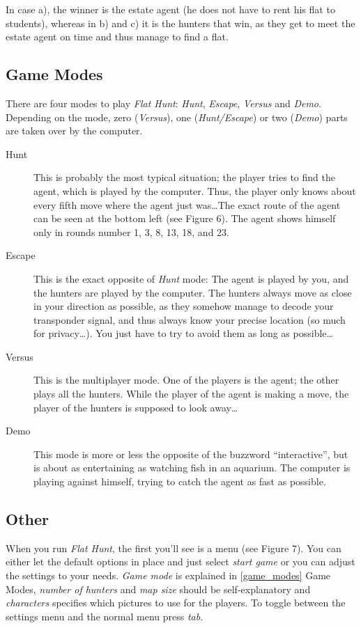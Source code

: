 In case a), the winner is the estate agent (he does not have to rent his flat to students), whereas in b) and c) it is the hunters that win, as they get to meet the estate agent on time and thus manage to find a flat.

\subsection{\label{game_modes}Game Modes}
There are four modes to play \emph{Flat Hunt}: \emph{Hunt}, \emph{Escape}, \emph{Versus} and \emph{Demo}. Depending on the mode, zero (\emph{Versus}), one (\emph{Hunt/Escape}) or two (\emph{Demo}) parts are taken over by the computer.

  \begin{description}
    
    \item[Hunt]This is probably the most typical situation; the player tries to find the agent, which is played by the computer. Thus, the player only knows about every fifth move where the agent just was\ldots The exact route of the agent can be seen at the bottom left (see Figure 6). The agent shows himself only in rounds number 1, 3, 8, 13, 18, and 23.
    
    \item[Escape]This is the exact opposite of \emph{Hunt} mode: The agent is played by you, and the hunters are played by the computer. The hunters always move as close in your direction as possible, as they somehow manage to decode your transponder signal, and thus always know your precise location (so much for privacy\ldots). You just have to try to avoid them as long as possible\ldots
  
    \item[Versus]This is the multiplayer mode. One of the players is the agent; the other plays all the hunters. While the player of the agent is making a move, the player of the hunters is supposed to look away\ldots
    
    \item[Demo]This mode is more or less the opposite of the buzzword ``interactive'', but is about as entertaining as watching fish in an aquarium. The computer is playing against himself, trying to catch the agent as fast as possible.
  \end{description}

  \subsection{Other}
  When you run \emph{Flat Hunt}, the first you'll see is a menu (see Figure 7). You can either let the default options in place and just select \emph{start game} or you can adjust the settings to your needs. \emph{Game mode} is explained in \ref{game_modes} Game Modes, \emph{number of hunters} and \emph{map size} should be self-explanatory and \emph{characters} specifies which pictures to use for the players. To toggle between the settings menu and the normal menu press \emph{tab}.\\

